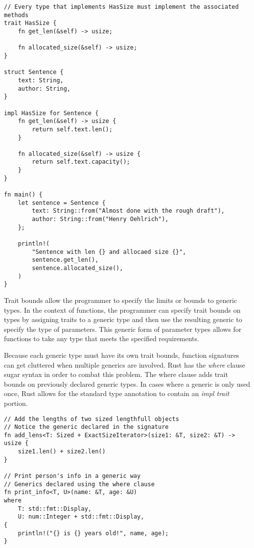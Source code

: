 \documentclass[12pt]{article}
\begin{document}
\singlespacing{}
\begin{verbatim}
// Every type that implements HasSize must implement the associated methods
trait HasSize {
    fn get_len(&self) -> usize;

    fn allocated_size(&self) -> usize;
}

struct Sentence {
    text: String,
    author: String,
}

impl HasSize for Sentence {
    fn get_len(&self) -> usize {
        return self.text.len();
    }

    fn allocated_size(&self) -> usize {
        return self.text.capacity();
    }
}

fn main() {
    let sentence = Sentence {
        text: String::from("Almost done with the rough draft"),
        author: String::from("Henry Oehlrich"),
    };

    println!(
        "Sentence with len {} and allocaed size {}",
        sentence.get_len(),
        sentence.allocated_size(),
    )
}
\end{verbatim}
\doublespacing{}

Trait bounds allow the programmer to specify the limits or bounds to generic
types. In the context of functions, the programmer can specify trait bounds on
types by assigning traits to a generic type and then use the resulting generic
to specify the type of parameters. This generic form of parameter types allows
for functions to take any type that meets the specified requirements.

Because each generic type must have its own trait bounds, function signatures
can get cluttered when multiple generics are involved. Rust has the
\textit{where} clause sugar syntax in order to combat this problem. The where
clause adds trait bounds on previously declared generic types. In cases where a
generic is only used once, Rust allows for the standard type annotation to
contain an \textit{impl trait} portion.

\singlespacing{}
\begin{verbatim}
// Add the lengths of two sized lengthfull objects
// Notice the generic declared in the signature
fn add_lens<T: Sized + ExactSizeIterator>(size1: &T, size2: &T) -> usize {
    size1.len() + size2.len()
}

// Print person's info in a generic way
// Generics declared using the where clause
fn print_info<T, U>(name: &T, age: &U)
where
    T: std::fmt::Display,
    U: num::Integer + std::fmt::Display,
{
    println!("{} is {} years old!", name, age);
}
\end{verbatim}
\doublespacing{}
\end{document}

